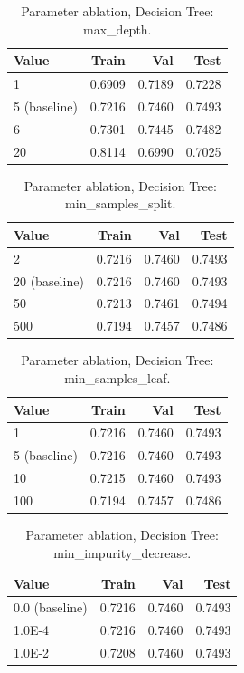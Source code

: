 \begin{table}[ht]
\centering
\small
\caption{Parameter ablation, Decision Tree: max\_depth.}
\label{tab:ablation-tree-max-depth}
\begin{tabular}{lrrr}
\toprule
Value & Train & Val & Test \\
\midrule
1 & 0.6909 & 0.7189 & 0.7228 \\
5 (baseline) & 0.7216 & 0.7460 & 0.7493 \\
6 & 0.7301 & 0.7445 & 0.7482 \\
20 & 0.8114 & 0.6990 & 0.7025 \\
\bottomrule
\end{tabular}
\end{table}

\begin{table}[ht]
\centering
\small
\caption{Parameter ablation, Decision Tree: min\_samples\_split.}
\label{tab:ablation-tree-min-samples-split}
\begin{tabular}{lrrr}
\toprule
Value & Train & Val & Test \\
\midrule
2 & 0.7216 & 0.7460 & 0.7493 \\
20 (baseline) & 0.7216 & 0.7460 & 0.7493 \\
50 & 0.7213 & 0.7461 & 0.7494 \\
500 & 0.7194 & 0.7457 & 0.7486 \\
\bottomrule
\end{tabular}
\end{table}

\begin{table}[ht]
\centering
\small
\caption{Parameter ablation, Decision Tree: min\_samples\_leaf.}
\label{tab:ablation-tree-min-samples-leaf}
\begin{tabular}{lrrr}
\toprule
Value & Train & Val & Test \\
\midrule
1 & 0.7216 & 0.7460 & 0.7493 \\
5 (baseline) & 0.7216 & 0.7460 & 0.7493 \\
10 & 0.7215 & 0.7460 & 0.7493 \\
100 & 0.7194 & 0.7457 & 0.7486 \\
\bottomrule
\end{tabular}
\end{table}

\begin{table}[ht]
\centering
\small
\caption{Parameter ablation, Decision Tree: min\_impurity\_decrease.}
\label{tab:ablation-tree-min-impurity-decrease}
\begin{tabular}{lrrr}
\toprule
Value & Train & Val & Test \\
\midrule
0.0 (baseline) & 0.7216 & 0.7460 & 0.7493 \\
1.0E-4 & 0.7216 & 0.7460 & 0.7493 \\
1.0E-2 & 0.7208 & 0.7460 & 0.7493 \\
\bottomrule
\end{tabular}
\end{table}


